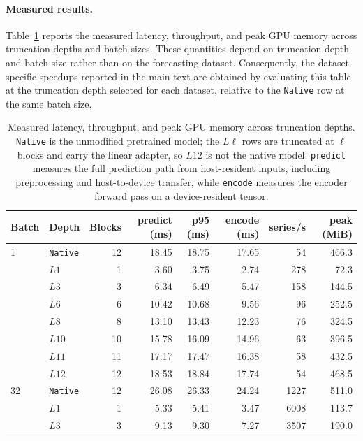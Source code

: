 \documentclass{article}
\begin{document}
\paragraph{Measured results.}
Table~\ref{tab:latency-full} reports the measured latency, throughput, and peak GPU memory across truncation depths and batch sizes. These quantities depend on truncation depth and batch size rather than on the forecasting dataset. Consequently, the dataset-specific speedups reported in the main text are obtained by evaluating this table at the truncation depth selected for each dataset, relative to the \texttt{Native} row at the same batch size.

\begin{table}[t]
    \centering
    \small
    \caption{
    Measured latency, throughput, and peak GPU memory across truncation depths.
    \texttt{Native} is the unmodified pretrained model; the \(L\ell\) rows are truncated at \(\ell\) blocks and carry the linear adapter, so \(L12\) is not the native model.
    \texttt{predict} measures the full prediction path from host-resident inputs, including preprocessing and host-to-device transfer, while \texttt{encode} measures the encoder forward pass on a device-resident tensor.
    }
    \label{tab:latency-full}
    \begin{tabular}{llrrrrrr}
        \toprule
        Batch & Depth & Blocks & predict (ms) & p95 (ms) & encode (ms) & series/s & peak (MiB) \\
        \midrule
        1 & \texttt{Native} & 12 & 18.45 & 18.75 & 17.65 & 54 & 466.3 \\
         & \(L1\) & 1 & 3.60 & 3.75 & 2.74 & 278 & 72.3 \\
         & \(L3\) & 3 & 6.34 & 6.49 & 5.47 & 158 & 144.5 \\
         & \(L6\) & 6 & 10.42 & 10.68 & 9.56 & 96 & 252.5 \\
         & \(L8\) & 8 & 13.10 & 13.43 & 12.23 & 76 & 324.5 \\
         & \(L10\) & 10 & 15.78 & 16.09 & 14.96 & 63 & 396.5 \\
         & \(L11\) & 11 & 17.17 & 17.47 & 16.38 & 58 & 432.5 \\
         & \(L12\) & 12 & 18.53 & 18.84 & 17.74 & 54 & 468.5 \\
        \midrule
        32 & \texttt{Native} & 12 & 26.08 & 26.33 & 24.24 & 1227 & 511.0 \\
         & \(L1\) & 1 & 5.33 & 5.41 & 3.47 & 6008 & 113.7 \\
         & \(L3\) & 3 & 9.13 & 9.30 & 7.27 & 3507 & 190.0 \\

\end{tabular}
\end{table}
\end{document}
